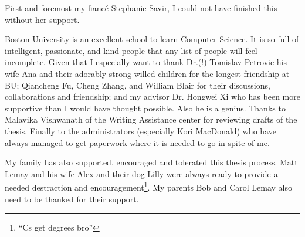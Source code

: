 First and foremost my fiancé Stephanie Savir, I could not have finished this without her support. %
 
Boston University is an excellent school to learn Computer Science.
It is so full of intelligent, passionate, and kind people that any list of people will feel incomplete.
Given that I especially want to thank Dr.(!) Tomislav Petrovic his wife Ana and their adorably strong willed children for the longest friendship at BU;
Qiancheng Fu, Cheng Zhang, and William Blair for their discussions, collaborations and friendship;
and my advisor Dr. Hongwei Xi who has been more supportive than I would have thought possible.
Also he is a genius.
Thanks to Malavika Vishwanath of the Writing Assistance center for reviewing drafts of the thesis.
Finally to the administrators (especially Kori MacDonald) who have always managed to get paperwork where it is needed to go in spite of me.

My family has also supported, encouraged and tolerated this thesis process.
Matt Lemay and his wife Alex and their dog Lilly were always ready to provide a needed destraction and encouragement\footnote{``Cs get degrees bro''}.
My parents Bob and Carol Lemay also need to be thanked for their support.
 

